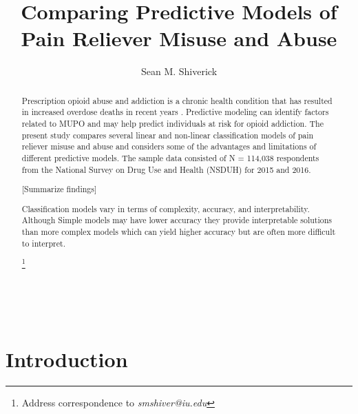 \\\documentclass[sigconf]{acmart}
\begin{document}
  \title{Comparing Predictive Models of Pain Reliever Misuse and Abuse}
  \author{Sean M. Shiverick}
\renewcommand{\shortauthors}{S.M. Shiverick}


\begin{abstract}

Prescription opioid abuse and addiction is a chronic health condition that 
has resulted in increased overdose deaths in recent years \cite{nida18}. 
Predictive modeling can identify factors related to MUPO and may help predict 
individuals at risk for opioid addiction. The present study compares several 
linear and non-linear classification models of pain reliever misuse and abuse 
and considers some of the advantages and limitations of different predictive 
models. The sample data consisted of N = 114,038 respondents from the 
National Survey on Drug Use and Health (NSDUH) for 2015 and 2016.

[Summarize findings]

Classification models vary in terms of complexity, accuracy, and 
interpretability. Although Simple models may have lower accuracy they provide 
interpretable solutions than more complex models which can yield higher accuracy 
but are often more difficult to interpret.   

\footnote{ Address correspondence to \textit{smshiver@iu.edu}}
\end{abstract}
\maketitle

\section{Introduction}
\end{document}
